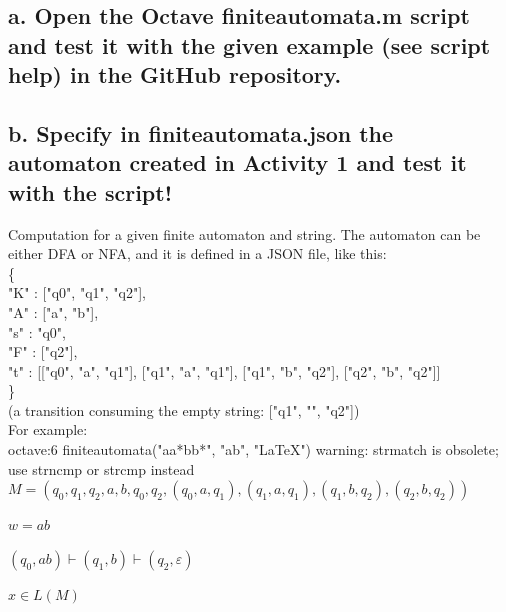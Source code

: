 \documentclass[20pt,oneside]{extbook}
\begin{document}
\subsection*{a. Open the Octave finiteautomata.m script and test it with the given
example (see script help) in the GitHub repository.\\
\\b. Specify in finiteautomata.json the automaton created in Activity 1
and test it with the script!\\}

Computation for a given finite automaton and string.
 The automaton can be either DFA or NFA, and it is defined
 in a JSON file, like this:\\
 \{\\
     "K" : ["q0", "q1", "q2"],\\
     "A" : ["a", "b"],\\
     "s" : "q0",\\
     "F" : ["q2"],\\
     "t" : [["q0", "a", "q1"],
            ["q1", "a", "q1"],
            ["q1", "b", "q2"],
            ["q2", "b", "q2"]]\\
   \}\\

   (a transition consuming the empty string: ["q1", "", "q2"])\\

For example:\\

octave:6 finiteautomata("aa*bb*", "ab", "LaTeX")
warning: strmatch is obsolete; use strncmp or strcmp instead\\

$M = ( {q_0, q_1, q_2}, {a, b}, q_0, {q_2}, {(q_0, a, q_1), (q_1, a, q_1), (q_1, b, q_2), (q_2, b, q_2)} )$

$w = ab$

$(q_0, ab) \vdash (q_1, b) \vdash (q_2, \varepsilon)$

$x \in L(M)$
\end{document}
